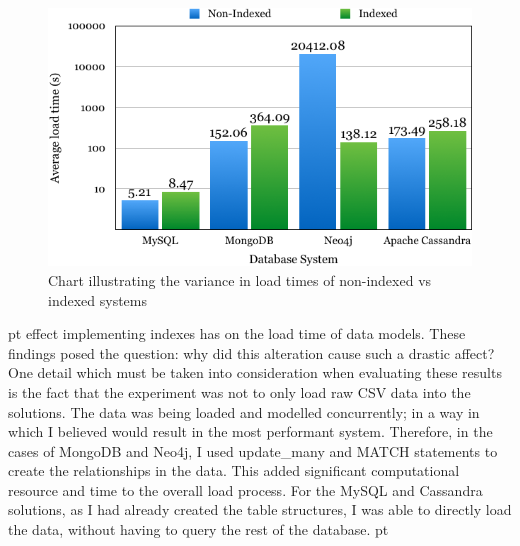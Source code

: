 \begin{figure}[H]\begin{center}\includegraphics[width=1\linewidth]{images/nonvsin}\caption{Chart illustrating the variance in load times of non-indexed vs indexed systems}\label{fig:nonvsin}\end{center}\end{figure}
 pt
effect implementing indexes has on the load time of data models. These findings posed the question: why did this alteration cause such a drastic affect? One detail which must be taken into consideration when evaluating these results is the fact that the experiment was not to only load raw CSV data into the solutions. The data was being loaded and modelled concurrently; in a way in which I believed would result in the most performant system. Therefore, in the cases of MongoDB and Neo4j, I used update\_many and MATCH statements to create the relationships in the data. This added significant computational resource and time to the overall load process. For the MySQL and Cassandra solutions, as I had already created the table structures, I was able to directly load the data, without having to query the rest of the database. pt

